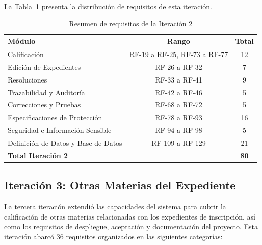 \documentclass[12pt,a4paper,oneside]{book}
\begin{document}
La Tabla~\ref{tab:iteracion2-resumen} presenta la distribución de requisitos de esta iteración.

\begin{table}[H]
\centering
\caption{Resumen de requisitos de la Iteración 2}
\label{tab:iteracion2-resumen}
\begin{tabular}{@{}lcc@{}}
\toprule
\textbf{Módulo} & \textbf{Rango} & \textbf{Total} \\
\midrule
Calificación & RF-19 a RF-25, RF-73 a RF-77 & 12 \\
Edición de Expedientes & RF-26 a RF-32 & 7 \\
Resoluciones & RF-33 a RF-41 & 9 \\
Trazabilidad y Auditoría & RF-42 a RF-46 & 5 \\
Correcciones y Pruebas & RF-68 a RF-72 & 5 \\
Especificaciones de Protección & RF-78 a RF-93 & 16 \\
Seguridad e Información Sensible & RF-94 a RF-98 & 5 \\
Definición de Datos y Base de Datos & RF-109 a RF-129 & 21 \\
\midrule
\textbf{Total Iteración 2} & & \textbf{80} \\
\bottomrule
\end{tabular}
\end{table}

\subsection{Iteración 3: Otras Materias del Expediente}
\label{subsec:iteracion3-otras-materias}

La tercera iteración extendió las capacidades del sistema para cubrir la calificación de otras materias relacionadas con los expedientes de inscripción, así como los requisitos de despliegue, aceptación y documentación del proyecto. Esta iteración abarcó 36 requisitos organizados en las siguientes categorías:
\end{document}
